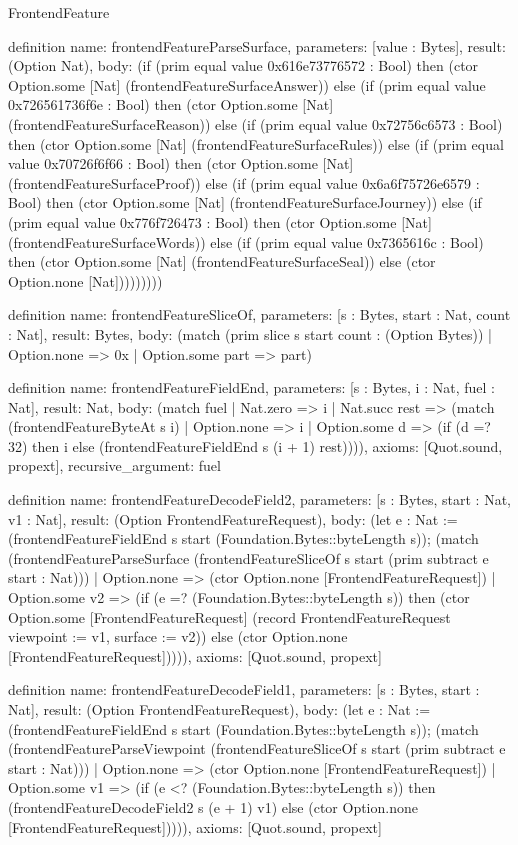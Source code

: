 \begin{lexlean}{FrontendFeature}
\begin{semanticmodule}
definition{
  name: frontendFeatureParseSurface,
  parameters: [value : Bytes],
  result: (Option Nat),
  body: (if (prim equal value 0x616e73776572 : Bool) then (ctor Option.some [Nat] (frontendFeatureSurfaceAnswer)) else (if (prim equal value 0x726561736f6e : Bool) then (ctor Option.some [Nat] (frontendFeatureSurfaceReason)) else (if (prim equal value 0x72756c6573 : Bool) then (ctor Option.some [Nat] (frontendFeatureSurfaceRules)) else (if (prim equal value 0x70726f6f66 : Bool) then (ctor Option.some [Nat] (frontendFeatureSurfaceProof)) else (if (prim equal value 0x6a6f75726e6579 : Bool) then (ctor Option.some [Nat] (frontendFeatureSurfaceJourney)) else (if (prim equal value 0x776f726473 : Bool) then (ctor Option.some [Nat] (frontendFeatureSurfaceWords)) else (if (prim equal value 0x7365616c : Bool) then (ctor Option.some [Nat] (frontendFeatureSurfaceSeal)) else (ctor Option.none [Nat]))))))))
}

definition{
  name: frontendFeatureSliceOf,
  parameters: [s : Bytes, start : Nat, count : Nat],
  result: Bytes,
  body: (match (prim slice s start count : (Option Bytes))
    | Option.none => 0x
    | Option.some part => part)
}

definition{
  name: frontendFeatureFieldEnd,
  parameters: [s : Bytes, i : Nat, fuel : Nat],
  result: Nat,
  body: (match fuel
    | Nat.zero => i
    | Nat.succ rest => (match (frontendFeatureByteAt s i)
      | Option.none => i
      | Option.some d => (if (d =? 32) then i else (frontendFeatureFieldEnd s (i + 1) rest)))),
  axioms: [Quot.sound, propext],
  recursive_argument: fuel
}

definition{
  name: frontendFeatureDecodeField2,
  parameters: [s : Bytes, start : Nat, v1 : Nat],
  result: (Option FrontendFeatureRequest),
  body: (let e : Nat := (frontendFeatureFieldEnd s start (Foundation.Bytes::byteLength s)); (match (frontendFeatureParseSurface (frontendFeatureSliceOf s start (prim subtract e start : Nat)))
    | Option.none => (ctor Option.none [FrontendFeatureRequest])
    | Option.some v2 => (if (e =? (Foundation.Bytes::byteLength s)) then (ctor Option.some [FrontendFeatureRequest] (record FrontendFeatureRequest {viewpoint := v1, surface := v2})) else (ctor Option.none [FrontendFeatureRequest])))),
  axioms: [Quot.sound, propext]
}

definition{
  name: frontendFeatureDecodeField1,
  parameters: [s : Bytes, start : Nat],
  result: (Option FrontendFeatureRequest),
  body: (let e : Nat := (frontendFeatureFieldEnd s start (Foundation.Bytes::byteLength s)); (match (frontendFeatureParseViewpoint (frontendFeatureSliceOf s start (prim subtract e start : Nat)))
    | Option.none => (ctor Option.none [FrontendFeatureRequest])
    | Option.some v1 => (if (e <? (Foundation.Bytes::byteLength s)) then (frontendFeatureDecodeField2 s (e + 1) v1) else (ctor Option.none [FrontendFeatureRequest])))),
  axioms: [Quot.sound, propext]
}


\end{semanticmodule}
\end{lexlean}
